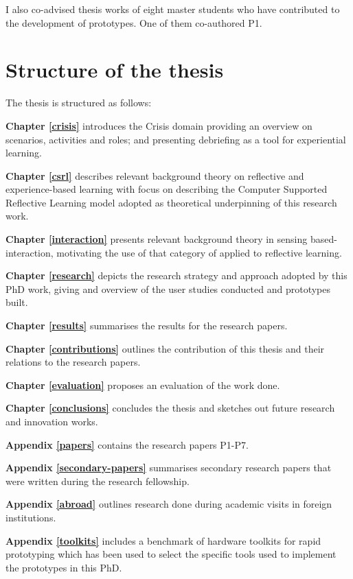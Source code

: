 I also co-advised thesis works of eight master students who have contributed to the development of prototypes. One of them co-authored P1.

\section{Structure of the thesis}\label{structure-of-the-thesis}

The thesis is structured as follows:

\textbf{Chapter \ref{crisis}} introduces the Crisis domain providing an overview on scenarios, activities and roles; and presenting debriefing as a tool for experiential learning.

\textbf{Chapter \ref{csrl}} describes relevant background theory on reflective and experience-based learning with focus on describing the Computer Supported Reflective Learning model adopted as theoretical underpinning of this research work.

\textbf{Chapter \ref{interaction}} presents relevant background theory in sensing based-interaction, motivating the use of that category of applied to reflective learning.

\textbf{Chapter \ref{research}} depicts the research strategy and approach adopted by this PhD work, giving and overview of the user studies conducted and prototypes built.

\textbf{Chapter \ref{results}} summarises the results for the research papers.

\textbf{Chapter \ref{contributions}} outlines the contribution of this thesis and their relations to the research papers.

\textbf{Chapter \ref{evaluation}} proposes an evaluation of the work done.

\textbf{Chapter \ref{conclusions}} concludes the thesis and sketches out future research and innovation works.

\textbf{Appendix \ref{papers}} contains the research papers P1-P7.

\textbf{Appendix \ref{secondary-papers}} summarises secondary research papers that were written during the research fellowship.

\textbf{Appendix \ref{abroad}} outlines research done during academic visits in foreign institutions.

\textbf{Appendix \ref{toolkits}} includes a benchmark of hardware toolkits for rapid prototyping which has been used to select the specific tools used to implement the prototypes in this PhD. 
